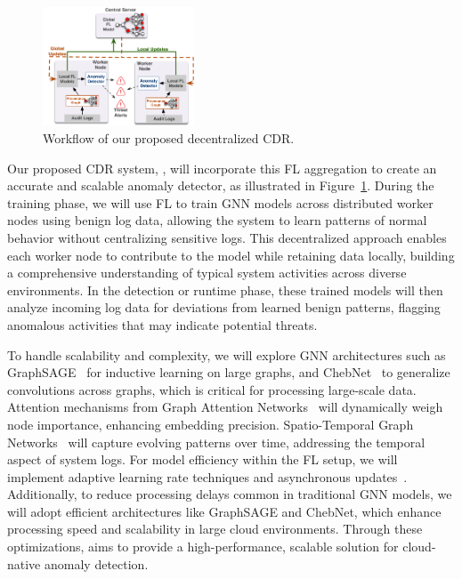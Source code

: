 \begin{figure}
    \centering \includegraphics[width=0.40\textwidth]{fig/arch.pdf}
    \caption{Workflow of our proposed decentralized CDR.}
    \label{fig:arch}
  \end{figure}

  Our proposed CDR system, \Sysa, will incorporate this FL aggregation to create an accurate and scalable anomaly detector, as illustrated in Figure~\ref{fig:arch}. During the training phase, we will use FL to train GNN models across distributed worker nodes using benign log data, allowing the system to learn patterns of normal behavior without centralizing sensitive logs. This decentralized approach enables each worker node to contribute to the model while retaining data locally, building a comprehensive understanding of typical system activities across diverse environments. In the detection or runtime phase, these trained models will then analyze incoming log data for deviations from learned benign patterns, flagging anomalous activities that may indicate potential threats.
  
  To handle scalability and complexity, we will explore GNN architectures such as GraphSAGE~\cite{hamilton2017inductive} for inductive learning on large graphs, and ChebNet~\cite{tang2019chebnet} to generalize convolutions across graphs, which is critical for processing large-scale data. Attention mechanisms from Graph Attention Networks~\cite{velivckovic2017graph} will dynamically weigh node importance, enhancing embedding precision. Spatio-Temporal Graph Networks~\cite{yu2017spatio} will capture evolving patterns over time, addressing the temporal aspect of system logs. For model efficiency within the FL setup, we will implement adaptive learning rate techniques and asynchronous updates~\cite{ye2022eco}. Additionally, to reduce processing delays common in traditional GNN models, we will adopt efficient architectures like GraphSAGE and ChebNet, which enhance processing speed and scalability in large cloud environments. Through these optimizations, \Sysa aims to provide a high-performance, scalable solution for cloud-native anomaly detection.



